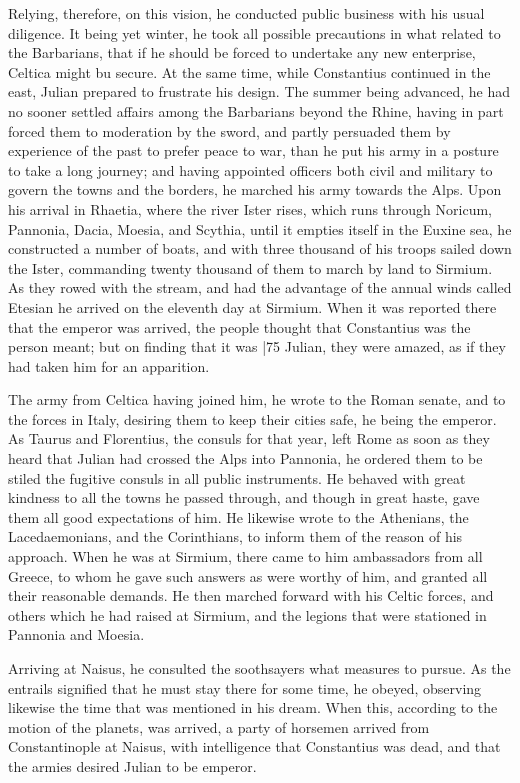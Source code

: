 Relying, therefore, on this vision, he conducted public business with his usual diligence. It being yet winter, he took all possible precautions in what related to the Barbarians, that if he should be forced to undertake any new enterprise, Celtica might bu secure. At the same time, while Constantius continued in the east, Julian prepared to frustrate his design. The summer being advanced, he had no sooner settled affairs among the Barbarians beyond the Rhine, having in part forced them to moderation by the sword, and partly persuaded them by experience of the past to prefer peace to war, than he put his army in a posture to take a long journey; and having appointed officers both civil and military to govern the towns and the borders, he marched his army towards the Alps. Upon his arrival in Rhaetia, where the river Ister rises, which runs through Noricum, Pannonia, Dacia, Moesia, and Scythia, until it empties itself in the Euxine sea, he constructed a number of boats, and with three thousand of his troops sailed down the Ister, commanding twenty thousand of them to march by land to Sirmium. As they rowed with the stream, and had the advantage of the annual winds called Etesian he arrived on the eleventh day at Sirmium. When it was reported there that the emperor was arrived, the people thought that Constantius was the person meant; but on finding that it was
|75 Julian, they were amazed, as if they had taken him for an apparition.

The army from Celtica having joined him, he wrote to the Roman senate, and to the forces in Italy, desiring them to keep their cities safe, he being the emperor. As Taurus and Florentius, the consuls for that year, left Rome as soon as they heard that Julian had crossed the Alps into Pannonia, he ordered them to be stiled the fugitive consuls in all public instruments. He behaved with great kindness to all the towns he passed through, and though in great haste, gave them all good expectations of him. He likewise wrote to the Athenians, the Lacedaemonians, and the Corinthians, to inform them of the reason of his approach. When he was at Sirmium, there came to him ambassadors from all Greece, to whom he gave such answers as were worthy of him, and granted all their reasonable demands. He then marched forward with his Celtic forces, and others which he had raised at Sirmium, and the legions that were stationed in Pannonia and Moesia.

Arriving at Naisus, he consulted the soothsayers what measures to pursue. As the entrails signified that he must stay there for some time, he obeyed, observing likewise the time that was mentioned in his dream. When this, according to the motion of the planets, was arrived, a party of horsemen arrived from Constantinople at Naisus, with intelligence that Constantius was dead, and that the armies desired Julian to be emperor.

